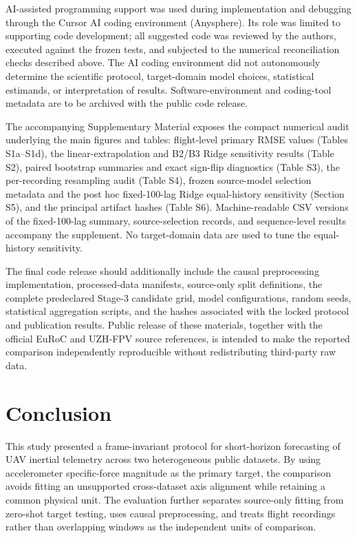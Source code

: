 \documentclass[preprint,12pt]{elsarticle}
\begin{document}
AI-assisted programming support was used during implementation and debugging through the Cursor AI coding environment (Anysphere). Its role was limited to supporting code development; all suggested code was reviewed by the authors, executed against the frozen tests, and subjected to the numerical reconciliation checks described above. The AI coding environment did not autonomously determine the scientific protocol, target-domain model choices, statistical estimands, or interpretation of results. Software-environment and coding-tool metadata are to be archived with the public code release.

The accompanying Supplementary Material exposes the compact numerical audit underlying the main figures and tables: flight-level primary RMSE values (Tables S1a--S1d), the linear-extrapolation and B2/B3 Ridge sensitivity results (Table S2), paired bootstrap summaries and exact sign-flip diagnostics (Table S3), the per-recording resampling audit (Table S4), frozen source-model selection metadata and the post hoc fixed-100-lag Ridge equal-history sensitivity (Section S5), and the principal artifact hashes (Table S6). Machine-readable CSV versions of the fixed-100-lag summary, source-selection records, and sequence-level results accompany the supplement. No target-domain data are used to tune the equal-history sensitivity.

The final code release should additionally include the causal preprocessing implementation, processed-data manifests, source-only split definitions, the complete predeclared Stage-3 candidate grid, model configurations, random seeds, statistical aggregation scripts, and the hashes associated with the locked protocol and publication results. Public release of these materials, together with the official EuRoC and UZH-FPV source references, is intended to make the reported comparison independently reproducible without redistributing third-party raw data.

\section{Conclusion}
\label{sec:conclusion}

This study presented a frame-invariant protocol for short-horizon forecasting of UAV inertial telemetry across two heterogeneous public datasets. By using accelerometer specific-force magnitude as the primary target, the comparison avoids fitting an unsupported cross-dataset axis alignment while retaining a common physical unit. The evaluation further separates source-only fitting from zero-shot target testing, uses causal preprocessing, and treats flight recordings rather than overlapping windows as the independent units of comparison.
\end{document}
